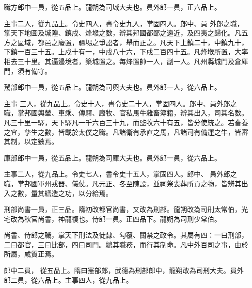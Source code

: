 \begin{pinyinscope}
 職方郎中一員，從五品上。龍朔為司域大夫也。員外郎一員，正六品上。



 主事二人，從九品上。令史四人，書令史九人，掌固四人。郎中、員
 外郎之職，掌天下地圖及城隍、鎮戍、烽堠之數，辨其邦國都鄙之遠近，及四夷之歸化。凡五方之區域，都邑之廢置，疆埸之爭訟者，舉而正之。凡天下上鎮二十，中鎮九十，下鎮一百三十五。上戍十有一，中戍八十六，下戍二百四十五。凡烽堠所置，大率相去三十里。其逼邊境者，築城置之。每烽置帥一人，副一人。凡州縣城門及倉庫門，須有備守。



 駕部郎中一員，從五品上。龍朔為司輿大夫也。員外郎一人，從六品上。



 主事
 三人，從九品上。令史十人，書令史二十人，掌固四人。郎中、員外郎之職，掌邦國輿輦、車乘、傳驛、廄牧、官私馬牛雜畜簿籍，辨其出入，司其名數。凡三十里一驛，天下驛凡一千六百三十九，而監牧六十有五，皆分使統之。若畜養之宜，孳生之數，皆載於太僕之職。凡諸衛有承直之馬，凡諸司有備運之牛，皆審其制，以定數焉。



 庫部郎中一員，從五品上。龍朔為司庫大夫也。員外郎一員，從六品上。



 主事二人，從九品上。令史七人，書令史十五人，掌固四人。郎中、
 員外郎之職，掌邦國軍州戎器、儀仗。凡元正、冬至陳設，並祠祭喪葬所貢之物，皆辨其出入之數，量其繕造之功，以分給焉。



 刑部尚書一員，正三品。隋初改都官尚書，又改為刑部。龍朔改為司刑太常伯，光宅改為秋官尚書，神龍復也。侍郎一員。正四品下。龍朔為司刑少常伯。



 尚書、侍郎之職，掌天下刑法及徒隸、勾覆、關禁之政令。其屬有四：一曰刑部，二曰都官，三曰比部，四曰司門。總其職務，而行其制命。凡中外百司之事，由於所屬，咸質正焉。



 郎中二員，
 從五品上。隋曰憲部郎，武德為刑部郎中，龍朔改為司刑大夫。員外郎二員，從六品上。主事四人，從九品上。




\end{pinyinscope}
